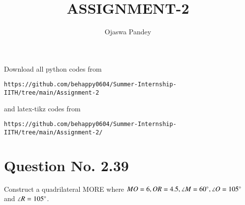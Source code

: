 \documentclass[journal,12pt,twocolumn]{IEEEtran}
\begin{document}
     \def\topbox#1{\raisebox{-\baselineskip}[0in][0in]{#1}}
     \def\midbox#1{\raisebox{-0.5\baselineskip}[0in][0in]{#1}}
\vspace{3cm}
\title{ASSIGNMENT-2}
\author{Ojaswa Pandey}
\maketitle
\newpage
\bigskip
\renewcommand{\thefigure}{\theenumi}
\renewcommand{\thetable}{\theenumi}
Download all python codes from 
\begin{lstlisting}
https://github.com/behappy0604/Summer-Internship-IITH/tree/main/Assignment-2
\end{lstlisting}
%
and latex-tikz codes from 
%
\begin{lstlisting}
https://github.com/behappy0604/Summer-Internship-IITH/tree/main/Assignment-2/
\end{lstlisting}
%
\section{Question No. 2.39}
Construct a quadrilateral MORE where $MO = 6, OR = 4.5, \angle M = 60 \degree, \angle O = 105 \degree$ and $\angle R = 105 \degree$.
%
\end{document}

